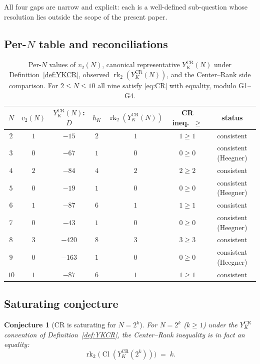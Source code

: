 \documentclass[11pt,a4paper,reqno]{amsart}
\newtheorem{conjecture}[theorem]{Conjecture}
\theoremstyle{definition}
\DeclareMathOperator{\Cl}{Cl}
\DeclareMathOperator{\rk}{rk}
\newcommand{\vtwo}{v_2}
\newcommand{\YKCR}{Y_K^{\mathrm{CR}}}
\begin{document}
All four gaps are narrow and explicit: each is a well-defined sub-question
whose resolution lies outside the scope of the present paper.

\subsection{Per-$N$ table and reconciliations}\label{ss:perN}

\begin{table}[h]
\centering
\renewcommand{\arraystretch}{1.15}
\begin{tabular}{ccccccc}
\toprule
$N$ & $\vtwo(N)$ & $\YKCR(N)$: $D$ & $h_K$ & $\rk_2(\YKCR(N))$ & CR ineq.\ $\ge$ & status \\
\midrule
$2$  & $1$ & $-15$    & $2$ & $1$ & $1\ge 1$ & consistent \\
$3$  & $0$ & $-67$    & $1$ & $0$ & $0\ge 0$ & consistent (Heegner) \\
$4$  & $2$ & $-84$    & $4$ & $2$ & $2\ge 2$ & consistent \\
$5$  & $0$ & $-19$    & $1$ & $0$ & $0\ge 0$ & consistent (Heegner) \\
$6$  & $1$ & $-87$    & $6$ & $1$ & $1\ge 1$ & consistent \\
$7$  & $0$ & $-43$    & $1$ & $0$ & $0\ge 0$ & consistent (Heegner) \\
$8$  & $3$ & $-420$   & $8$ & $3$ & $3\ge 3$ & consistent \\
$9$  & $0$ & $-163$   & $1$ & $0$ & $0\ge 0$ & consistent (Heegner) \\
$10$ & $1$ & $-87$    & $6$ & $1$ & $1\ge 1$ & consistent \\
\bottomrule
\end{tabular}
\caption{Per-$N$ values of $\vtwo(N)$, canonical representative
$\YKCR(N)$ under Definition~\ref{def:YKCR}, observed $\rk_2(\YKCR(N))$, and
the Center--Rank side comparison.  For $2\le N\le 10$ all nine satisfy
\eqref{eq:CR} with equality, modulo G1--G4.}\label{tab:perN}
\end{table}

\subsection{Saturating conjecture}\label{ss:saturating}

\begin{conjecture}[CR is saturating for $N=2^k$]\label{conj:saturate}
For $N=2^k$ ($k\ge 1$) under the $\YKCR$ convention of
Definition~\ref{def:YKCR}, the Center--Rank inequality is in fact an
equality:
\[
   \rk_2\bigl(\Cl(\YKCR(2^k))\bigr) \;=\; k.
\]
\end{conjecture}
\end{document}
